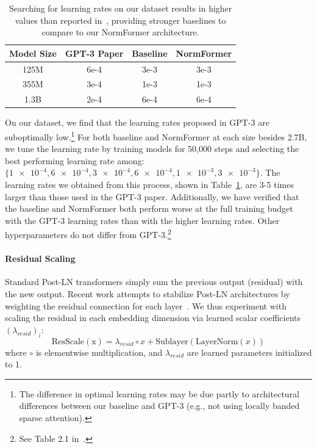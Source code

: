 \documentclass{article} %
\begin{document}
\begin{table}[t]
\begin{center}
\begin{tabular}{@{}cccc@{}}
\toprule
Model Size & GPT-3 Paper & Baseline & NormFormer \\ \midrule
125M       & 6e-4    & 3e-3 & 3e-3   \\
355M       & 3e-4    & 1e-3 & 1e-3   \\
1.3B       & 2e-4    & 6e-4 & 6e-4   \\\bottomrule
\end{tabular}
\caption{Searching for learning rates on our dataset results in higher values than reported in~\citet{brown2020gpt3}, providing stronger baselines to compare to our NormFormer architecture.}
\label{tab:lr}
\end{center}
\end{table}

On our dataset, we find that the learning rates proposed in GPT-3 are suboptimally low.\footnote{The difference in optimal learning rates may be due partly to architectural differences between our baseline and GPT-3 (e.g., not using locally banded sparse attention).} For both baseline and NormFormer at each size besides 2.7B, we tune the learning rate by training models for 50,000 steps and selecting the best performing learning rate among: $\{\num{1e-4}, \num{6e-4}, \num{3e-4}, \num{6e-4}, \num{1e-3}, \num{3e-3}\}$. The learning rates we obtained from this process, shown in Table~\ref{tab:lr}, are 3-5 times larger than those used in the GPT-3 paper. Additionally, we have verified that the baseline and NormFormer both perform worse at the full training budget with the GPT-3 learning rates than with the higher learning rates. Other hyperparameters do not differ from GPT-3.\footnote{See Table 2.1 in~\citet{brown2020gpt3}.}


\paragraph{Residual Scaling}

Standard Post-LN transformers simply sum the previous output (residual) with the new output. Recent work attempts to stabilize Post-LN architectures by weighting the residual connection for each layer~\citep{zhu2021gradinit, liu2020understanding}.
We thus experiment with scaling the residual in each embedding dimension via learned scalar coefficients  $(\lambda_{resid})_i$:
\[
\mathrm{ResScale(x)} =  \lambda_{resid}  \circ x+ \mathrm{Sublayer}(\mathrm{LayerNorm}(x))
\]
where $\circ$ is elementwise multiplication, and $\lambda_{resid}$ are learned parameters initialized to 1.
\end{document}

